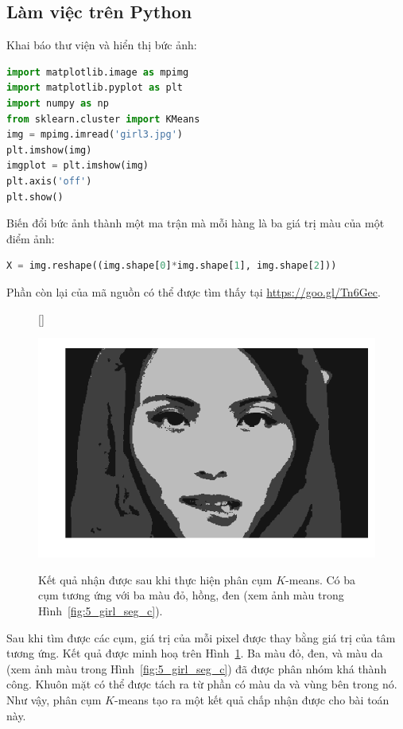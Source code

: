 \subsection{Làm việc trên Python}

{Khai báo thư viện và hiển thị bức ảnh:}

\begin{lstlisting}[language=Python]
import matplotlib.image as mpimg
import matplotlib.pyplot as plt
import numpy as np
from sklearn.cluster import KMeans
img = mpimg.imread('girl3.jpg')
plt.imshow(img)
imgplot = plt.imshow(img)
plt.axis('off')
plt.show()
\end{lstlisting}


{Biến đổi bức ảnh thành một ma trận mà mỗi hàng là ba giá trị màu của một điểm ảnh:}
\begin{lstlisting}[language=Python]
X = img.reshape((img.shape[0]*img.shape[1], img.shape[2]))
\end{lstlisting}

Phần còn lại của mã nguồn có thể được tìm thấy tại \url{https://goo.gl/Tn6Gec}.



\begin{figure}[t]
[\FBwidth]
{\caption{
Kết quả nhận được sau khi thực hiện phân cụm $K$-means.
Có ba cụm tương ứng với ba màu đỏ, hồng, đen (xem ảnh màu trong Hình~\ref{fig:5_girl_seg_c}).
}
\label{fig:5_girl_seg}}
{ %
\includegraphics[width=.5\textwidth]{Chapters/03_SimpleML/4_kmeans/girl_seg_gray.png}
}
\end{figure}

Sau khi tìm được các cụm, giá trị của mỗi pixel được thay bằng giá trị của
tâm tương ứng. Kết quả được minh hoạ trên Hình~\ref{fig:5_girl_seg}. Ba màu
đỏ, đen, và màu da (xem ảnh màu trong Hình~\ref{fig:5_girl_seg_c}) đã được phân
nhóm khá thành công. Khuôn mặt có thể được tách ra từ phần có màu da và vùng
bên trong nó. Như vậy, phân cụm $K$-means tạo ra một kết quả chấp nhận được
cho bài toán này.


